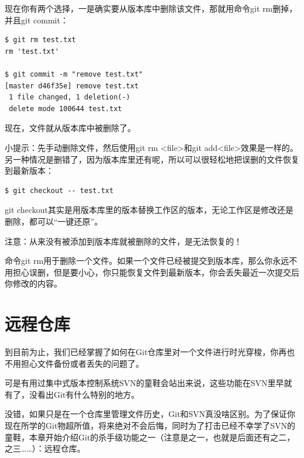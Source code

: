 现在你有两个选择，一是确实要从版本库中删除该文件，那就用命令git rm删掉，并且git commit：

\begin{verbatim}
$ git rm test.txt
rm 'test.txt'

$ git commit -m "remove test.txt"
[master d46f35e] remove test.txt
 1 file changed, 1 deletion(-)
 delete mode 100644 test.txt
\end{verbatim}

现在，文件就从版本库中被删除了。

 小提示：先手动删除文件，然后使用git rm <file>和git add<file>效果是一样的。
另一种情况是删错了，因为版本库里还有呢，所以可以很轻松地把误删的文件恢复到最新版本：

\begin{verbatim}
$ git checkout -- test.txt
\end{verbatim}

git checkout其实是用版本库里的版本替换工作区的版本，无论工作区是修改还是删除，都可以“一键还原”。

 注意：从来没有被添加到版本库就被删除的文件，是无法恢复的！

\begin{tcolorbox}
命令git rm用于删除一个文件。如果一个文件已经被提交到版本库，那么你永远不用担心误删，但是要小心，你只能恢复文件到最新版本，你会丢失最近一次提交后你修改的内容。
\end{tcolorbox}

\chapter{远程仓库}

到目前为止，我们已经掌握了如何在Git仓库里对一个文件进行时光穿梭，你再也不用担心文件备份或者丢失的问题了。

可是有用过集中式版本控制系统SVN的童鞋会站出来说，这些功能在SVN里早就有了，没看出Git有什么特别的地方。

没错，如果只是在一个仓库里管理文件历史，Git和SVN真没啥区别。为了保证你现在所学的Git物超所值，将来绝对不会后悔，同时为了打击已经不幸学了SVN的童鞋，本章开始介绍Git的杀手级功能之一（注意是之一，也就是后面还有之二，之三……）：远程仓库。

